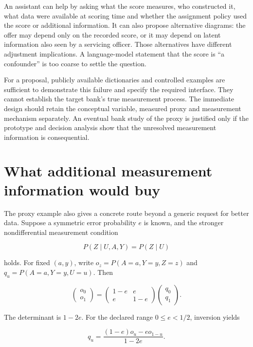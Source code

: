 An assistant can help by asking what the score measures, who constructed
it, what data were available at scoring time and whether the assignment
policy used the score or additional information. It can also propose
alternative diagrams: the offer may depend only on the recorded score,
or it may depend on latent information also seen by a servicing officer.
Those alternatives have different adjustment implications. A
language-model statement that the score is ``a confounder'' is too
coarse to settle the question.

For a proposal, publicly available dictionaries and controlled examples
are sufficient to demonstrate this failure and specify the required
interface. They cannot establish the target bank's true measurement
process. The immediate design should retain the conceptual variable,
measured proxy and measurement mechanism separately. An eventual bank
study of the proxy is justified only if the prototype and decision
analysis show that the unresolved measurement information is
consequential.

\hypertarget{what-additional-measurement-information-would-buy}{%
\section{What additional measurement information would
buy}\label{what-additional-measurement-information-would-buy}}

The proxy example also gives a concrete route beyond a generic request
for better data. Suppose a symmetric error probability \(e\) is known,
and the stronger nondifferential measurement condition

\[
 P(Z\mid U,A,Y)=P(Z\mid U)
\]

holds. For fixed \((a,y)\), write \(o_z=P(A=a,Y=y,Z=z)\) and
\(q_u=P(A=a,Y=y,U=u)\). Then

\[
 \begin{pmatrix}o_0\\o_1\end{pmatrix}
 =
 \begin{pmatrix}1-e&e\\e&1-e\end{pmatrix}
 \begin{pmatrix}q_0\\q_1\end{pmatrix}.
\]

The determinant is \(1-2e\). For the declared range \(0\leq e<1/2\),
inversion yields

\[
 q_u=\frac{(1-e)o_u-eo_{1-u}}{1-2e}.
\]

